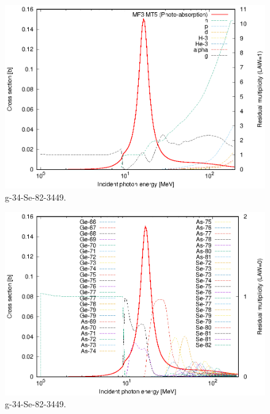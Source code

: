 \begin{figure}
 \includegraphics[width=\linewidth]{eps/g_34-Se-82_3449.eps}
  \caption{g-34-Se-82-3449.}
\end{figure}
\begin{figure}
 \includegraphics[width=\linewidth]{eps-law0/g_34-Se-82_3449.eps}
 \caption{g-34-Se-82-3449.}
\end{figure}
\newpage \clearpage

